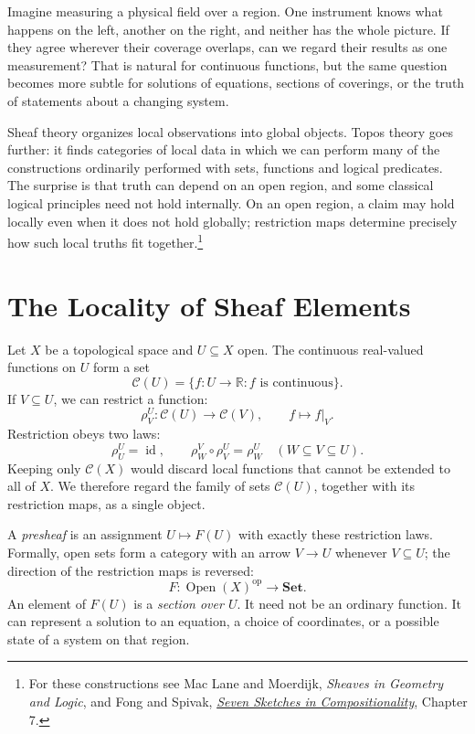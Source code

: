 
Imagine measuring a physical field over a region. One instrument knows what happens on the left, another on the right, and neither has the whole picture. If they agree wherever their coverage overlaps, can we regard their results as one measurement? That is natural for continuous functions, but the same question becomes more subtle for solutions of equations, sections of coverings, or the truth of statements about a changing system.

Sheaf theory organizes local observations into global objects. Topos theory goes further: it finds categories of local data in which we can perform many of the constructions ordinarily performed with sets, functions and logical predicates. The surprise is that truth can depend on an open region, and some classical logical principles need not hold internally. On an open region, a claim may hold locally even when it does not hold globally; restriction maps determine precisely how such local truths fit together.\footnote{For these constructions see Mac Lane and Moerdijk, \emph{Sheaves in Geometry and Logic}, and Fong and Spivak, \href{https://ocw.mit.edu/courses/18-s097-applied-category-theory-january-iap-2019/pages/lecture-videos-and-readings/chapter-7-logic-of-behavior-sheaves-toposes-languages/}{\emph{Seven Sketches in Compositionality}}, Chapter 7.}

\section{The Locality of Sheaf Elements}

Let \(X\) be a topological space and \(U\subseteq X\) open. The continuous real-valued functions on \(U\) form a set
\[
 \mathcal C(U)=\{f:U\to\mathbb R:f\text{ is continuous}\}.
\]
If \(V\subseteq U\), we can restrict a function:
\[
 \rho^U_V:\mathcal C(U)\to\mathcal C(V),
 \qquad f\mapsto f|_V.
\]
Restriction obeys two laws:
\[
 \rho^U_U=\operatorname{id},\qquad
 \rho^V_W\circ\rho^U_V=\rho^U_W
 \quad(W\subseteq V\subseteq U).
\]
Keeping only \(\mathcal C(X)\) would discard local functions that cannot be extended to all of \(X\). We therefore regard the family of sets \(\mathcal C(U)\), together with its restriction maps, as a single object.

A \emph{presheaf} is an assignment \(U\mapsto F(U)\) with exactly these restriction laws. Formally, open sets form a category with an arrow \(V\to U\) whenever \(V\subseteq U\); the direction of the restriction maps is reversed:
\[
 \boxed{F:\operatorname{Open}(X)^{\mathrm{op}}\longrightarrow\mathbf{Set}.}
\]
An element of \(F(U)\) is a \emph{section over \(U\)}. It need not be an ordinary function. It can represent a solution to an equation, a choice of coordinates, or a possible state of a system on that region.

